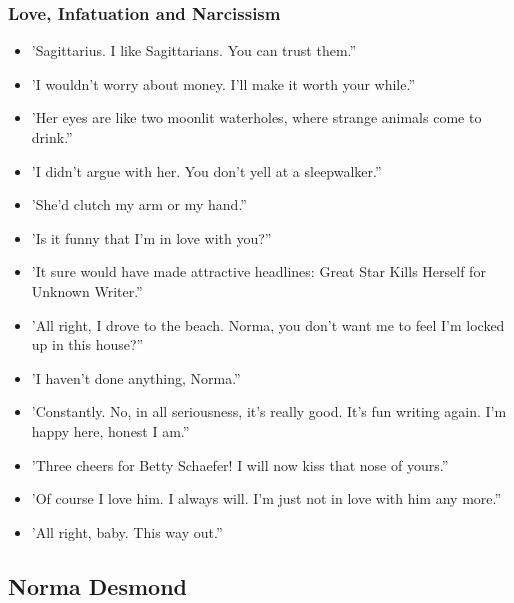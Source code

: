 \documentclass[a4paper]{article}
\begin{document}
\subsubsection{Love, Infatuation and Narcissism}

\begin{itemize}
\item 'Sagittarius. I like Sagittarians. You can trust them.”
\item 'I wouldn't worry about money. I'll make it worth your while.”
\item 'Her eyes are like two moonlit waterholes, where strange animals come to drink.”
\item 'I didn’t argue with her. You don't yell at a sleepwalker.”
\item 'She’d clutch my arm or my hand.”
\item 'Is it funny that I'm in love with you?”
\item 'It sure would have made attractive headlines: Great Star Kills Herself for Unknown Writer.”
\item 'All right, I drove to the beach. Norma, you don't want me to feel I'm locked up in this house?”
\item 'I haven't done anything, Norma.”
\item 'Constantly. No, in all seriousness, it's really good. It's fun writing again. I'm happy here, honest I am.”
\item 'Three cheers for Betty Schaefer! I will now kiss that nose of yours.”
\item 'Of course I love him. I always will. I'm just not in love with him any more.”
\item 'All right, baby. This way out.”
\end{itemize}


\subsection{Norma Desmond}
\end{document}

